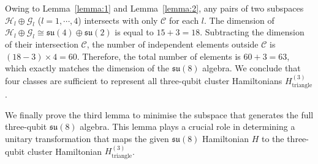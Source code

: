 \documentclass[aps,showpacs,amsmath,amssymb,twocolumn,prx,longbibliography,superscriptaddress,notitlepage,floatfix,10pt]{revtex4-2}
\begin{document}
Owing to Lemma~\ref{lemma:1} and Lemma~\ref{lemma:2}, any pairs of two subspaces
$\mathcal{H}_{l}\oplus\mathcal{G}_{l}$ ($l=1,\cdots,4$) intersects with only $\mathcal{C}$ for each $l$. The dimension of  $\mathcal{H}_{l}\oplus\mathcal{G}_{l}\cong\mathfrak{su}(4)\oplus\mathfrak{su}(2)$ is equal to $15+3=18$. Subtracting the dimension of their intersection $\mathcal{C}$, the number of independent elements outside $\mathcal{C}$ is 
$(18-3)\times4 = 60$. Therefore, the total number of elements is $60+3=63$, which exactly matches the dimension of the $\mathfrak{su}(8)$ algebra. We conclude that four classes are sufficient to represent all three-qubit cluster Hamiltonians $H_{\mathrm{triangle}}^{(3)}$.

We finally prove the third lemma to minimise the subspace that generates the full three-qubit $\mathfrak{su}(8)$ algebra. This lemma plays a crucial role in determining a unitary transformation that maps the given $\mathfrak{su}(8)$ Hamiltonian $H$ to the three-qubit cluster Hamiltonian $H_{\mathrm{triangle}}^{(3)}$.
\end{document}
